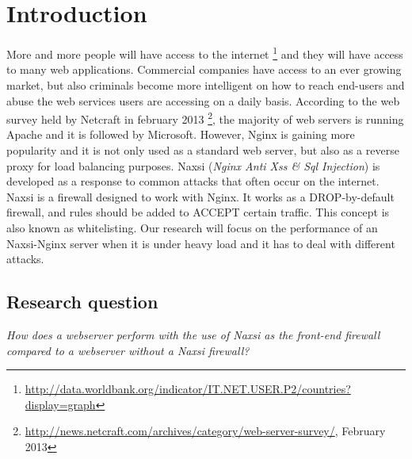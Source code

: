\documentclass[Introduction]{subfiles}
\begin{document}
\section{Introduction}
\label{sec:Introduction}
More and more people will have access to the internet \footnote{\url{http://data.worldbank.org/indicator/IT.NET.USER.P2/countries?display=graph}} and they will have access to many web applications. Commercial companies have access to an ever growing market, but also criminals become more intelligent on how to reach end-users and abuse the web services users are accessing on a daily basis.
According to the web survey held by Netcraft in february 2013 \footnote{\url{http://news.netcraft.com/archives/category/web-server-survey/}, February 2013}, the majority of web servers is running Apache and it is followed by Microsoft. However, Nginx is gaining more popularity and it is not only used as a standard web server, but also as a reverse proxy for load balancing purposes. Naxsi (\emph{Nginx Anti Xss \& Sql Injection}) is developed as a response to common attacks that often occur on the internet. Naxsi is a firewall designed to work with Nginx. It works as a DROP-by-default firewall, and rules should be added to ACCEPT certain traffic. This concept is also known as whitelisting.
Our research will focus on the performance of an Naxsi-Nginx server when it is under heavy load and it has to deal with different attacks.

\subsection{Research question}
\emph{How does a webserver perform with the use of Naxsi as the front-end firewall compared to a webserver without a Naxsi firewall?}
\end{document}
